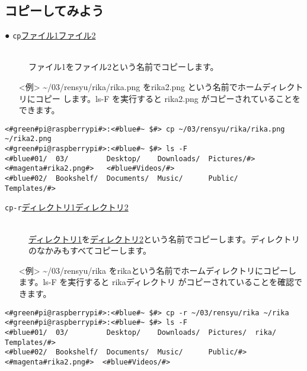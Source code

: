 \subsection{コピーしてみよう}
\begin{description}
\item[● \texttt{cp}\textvisiblespace \underline{ファイル1}\textvisiblespace \underline{ファイル2}]\mbox{}\\
ファイル1をファイル2という名前でコピーします。
\end{description}
\begin{itemize}
\item[<例>]\textasciitilde /03/rensyu/rika/rika.png をrika2.png という名前でホームディレクトリにコピー
します。ls\textvisiblespace -F を実行すると rika2.png がコピーされていることをできます。
\end{itemize}
\begin{lstlisting}[caption=cpの例, label=cp]
<#green#pi@raspberrypi#>:<#blue#~ $#> cp ~/03/rensyu/rika/rika.png ~/rika2.png
<#green#pi@raspberrypi#>:<#blue#~ $#> ls -F
<#blue#01/  03/         Desktop/    Downloads/  Pictures/#>  <#magenta#rika2.png#>   <#blue#Videos/#>
<#blue#02/  Bookshelf/  Documents/  Music/      Public/    Templates/#>
\end{lstlisting}
\begin{description}
\item[\texttt{cp}\textvisiblespace \texttt{-r}\textvisiblespace \underline{ディレクトリ1}\textvisiblespace \underline{ディレクトリ2}]\mbox{}\\
\underline{ディレクトリ1}を\underline{ディレクトリ2}という名前でコピーします。ディレクトリのなかみもすべてコピーします。
\end{description}
\begin{itemize}
\item[<例>]\textasciitilde /03/rensyu/rika をrikaという名前でホームディレクトリにコピーします。ls\textvisiblespace -F を実行すると rikaディレクトリ がコピーされていることを確認できます。
\end{itemize}
\begin{lstlisting}[caption=cp -rの例, label=cp-R]
<#green#pi@raspberrypi#>:<#blue#~ $#> cp -r ~/03/rensyu/rika ~/rika
<#green#pi@raspberrypi#>:<#blue#~ $#> ls -F
<#blue#01/  03/         Desktop/    Downloads/  Pictures/  rika/      Templates/#>
<#blue#02/  Bookshelf/  Documents/  Music/      Public/#>    <#magenta#rika2.png#>  <#blue#Videos/#>
\end{lstlisting}

